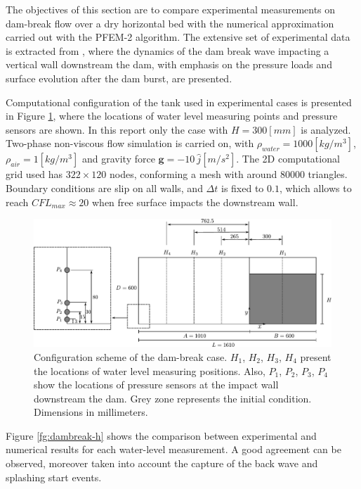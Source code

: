 \documentclass[a4paper,conference]{IEEEtran}
\begin{document}
The objectives of this section are to compare experimental measurements on dam-break flow over a dry horizontal bed with the numerical approximation carried out with the PFEM-2 algorithm. The extensive set of experimental data is extracted from \cite{Lobovsky13}, where the dynamics of the dam break wave impacting a vertical wall downstream the dam, with emphasis on the pressure loads and surface evolution after the dam burst, are presented.

Computational configuration of the tank used in experimental cases is presented in Figure \ref{fg:dambreak-config}, where the locations of water level measuring points and pressure sensors are shown. In this report only the case with $H=300[mm]$ is analyzed. Two-phase non-viscous flow simulation is carried on, with $\rho_{water}=1000[kg/m^3]$, $\rho_{air}=1[kg/m^3]$ and gravity force $\mathbf{g}=-10\ \hat{j} [m/s^2]$. The 2D computational grid used has $322\times120$ nodes, conforming a mesh with around $80000$ triangles. Boundary conditions are slip on all walls, and $\Delta t$ is fixed to $0.1$, which allows to reach $CFL_{max}\approx20$ when free surface impacts the downstream wall.

\begin{figure}
  \begin{center}
      \includegraphics[width=\columnwidth]{images/dam_break_config.pdf}
  \end{center}
  \caption{\label{fg:dambreak-config} Configuration scheme of the dam-break case. $H_1$, $H_2$, $H_3$, $H_4$ present the locations of water level measuring positions. Also, $P_1$, $P_2$, $P_3$, $P_4$ show the locations of pressure sensors at the impact wall downstream the dam. Grey zone represents the initial condition. Dimensions in millimeters.}
\end{figure}

Figure \ref{fg:dambreak-h} shows the comparison between experimental and numerical results for each water-level measurement. A good agreement can be observed, moreover taken into account the capture of the back wave and splashing start events.
\end{document}
